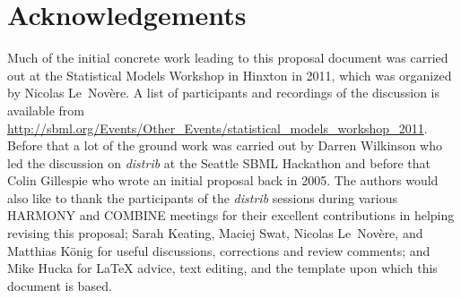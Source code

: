 \documentclass[draftspec]{sbmlpkgspec}
\newcommand{\distribshort}{\emph{distrib}\xspace}
\begin{document}









\appendix




\section{Acknowledgements}
\label{sec:acknowledgements}

Much of the initial concrete work leading to this proposal document
was carried out at the Statistical Models Workshop in Hinxton in 2011,
which was organized by Nicolas Le~Nov\`{e}re. A list of participants
and recordings of the discussion is available from
\url{http://sbml.org/Events/Other_Events/statistical_models_workshop_2011}.
Before that a lot of the ground work was carried out by Darren
Wilkinson who led the discussion on \distribshort at the Seattle SBML
Hackathon and before that Colin Gillespie who wrote an initial
proposal back in 2005. The authors would also like to thank the
participants of the \distribshort sessions during various HARMONY and
COMBINE meetings for their excellent contributions in helping revising
this proposal; Sarah Keating, Maciej Swat, Nicolas Le~Nov\`{e}re, and Matthias K\"{o}nig
for useful discussions, corrections and review comments; and Mike
Hucka for \LaTeX{} advice, text editing, and the template upon which this
document is based.

\appendix



%
%





\end{document}
